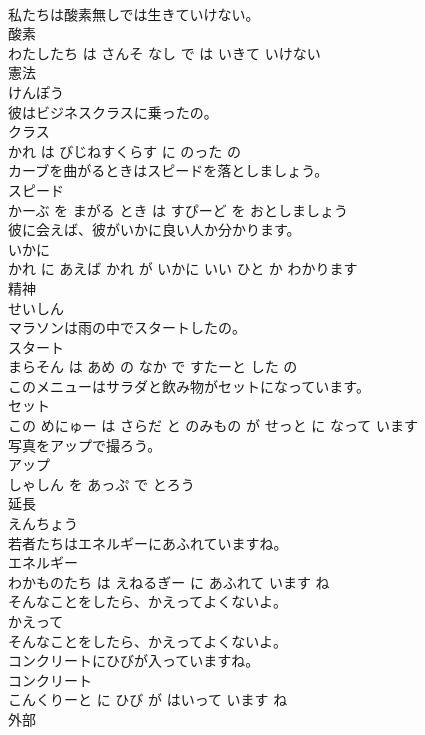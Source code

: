 \documentclass[8pt]{extreport}
\begin{document}
\begin{CJK}{UTF8}{min}
\\	私たちは酸素無しでは生きていけない。	
\\	酸素 
\\	わたしたち は さんそ なし で は いきて いけない			
\\	憲法	
\\	けんぽう			
\\	彼はビジネスクラスに乗ったの。	
\\	クラス 
\\	かれ は びじねすくらす に のった の			
\\	カーブを曲がるときはスピードを落としましょう。	
\\	スピード 
\\	かーぶ を まがる とき は すぴーど を おとしましょう			
\\	彼に会えば、彼がいかに良い人か分かります。	
\\	いかに 
\\	かれ に あえば かれ が いかに いい ひと か わかります			
\\	精神	
\\	せいしん			
\\	マラソンは雨の中でスタートしたの。	
\\	スタート 
\\	まらそん は あめ の なか で すたーと した の			
\\	このメニューはサラダと飲み物がセットになっています。	
\\	セット 
\\	この めにゅー は さらだ と のみもの が せっと に なって います			
\\	写真をアップで撮ろう。	
\\	アップ 
\\	しゃしん を あっぷ で とろう			
\\	延長	
\\	えんちょう			
\\	若者たちはエネルギーにあふれていますね。	
\\	エネルギー 
\\	わかものたち は えねるぎー に あふれて います ね			
\\	そんなことをしたら、かえってよくないよ。	
\\	かえって 
\\	そんなことをしたら、かえってよくないよ。			
\\	コンクリートにひびが入っていますね。	
\\	コンクリート 
\\	こんくりーと に ひび が はいって います ね			
\\	外部	

\end{CJK}
\end{document}
